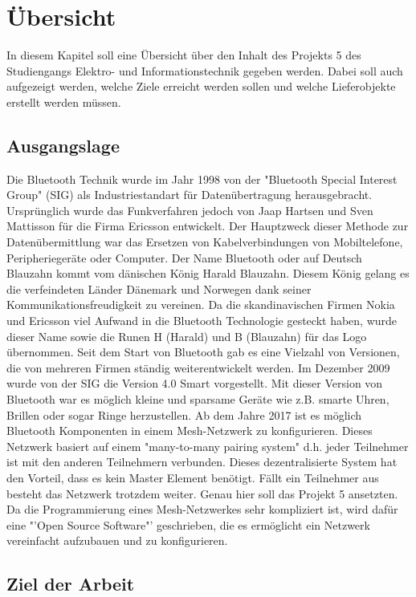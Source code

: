 	\clearpage
\section{Übersicht}\label{sec:Uebersicht}

In diesem Kapitel soll eine Übersicht über den Inhalt des Projekts 5 des Studiengangs Elektro- und Informationstechnik gegeben werden. Dabei soll auch aufgezeigt werden, welche Ziele erreicht werden sollen und welche Lieferobjekte erstellt werden müssen.

\subsection{Ausgangslage}\label{subsec:Ausgangslage}

Die Bluetooth Technik wurde im Jahr 1998 von der "Bluetooth Special Interest Group" (SIG) als Industriestandart für Datenübertragung herausgebracht. Ursprünglich wurde das Funkverfahren jedoch von Jaap Hartsen und Sven Mattisson für die Firma Ericsson entwickelt. Der Hauptzweck dieser Methode zur Datenübermittlung war das Ersetzen von Kabelverbindungen von Mobiltelefone, Peripheriegeräte oder Computer. Der Name Bluetooth oder auf Deutsch Blauzahn kommt vom dänischen König Harald Blauzahn. Diesem König gelang es die verfeindeten Länder Dänemark und Norwegen dank seiner Kommunikationsfreudigkeit zu vereinen. Da die skandinavischen Firmen Nokia und Ericsson viel Aufwand in die Bluetooth Technologie gesteckt haben, wurde dieser Name sowie die Runen H (Harald) und B (Blauzahn) für das Logo übernommen.\cite{michna_entwicklungsgeschichte_2019} Seit dem Start von Bluetooth gab es eine Vielzahl von Versionen, die von mehreren Firmen ständig weiterentwickelt werden. Im Dezember 2009 wurde von der SIG die Version 4.0 Smart vorgestellt. Mit dieser Version von Bluetooth war es möglich kleine und sparsame Geräte wie z.B. smarte Uhren, Brillen oder sogar Ringe herzustellen.\cite{bluetooth_sig_our_2019} Ab dem Jahre 2017 ist es möglich Bluetooth Komponenten in einem Mesh-Netzwerk zu konfigurieren.\cite{eckstein_neue_2019} Dieses Netzwerk basiert auf einem "many-to-many pairing system" d.h. jeder Teilnehmer ist mit den anderen Teilnehmern verbunden. Dieses dezentralisierte System hat den Vorteil, dass es kein Master Element benötigt. Fällt ein Teilnehmer aus besteht das Netzwerk trotzdem weiter.\cite{woolley_intro_2017} Genau hier soll das Projekt 5 ansetzten. Da die Programmierung eines Mesh-Netzwerkes sehr kompliziert ist, wird dafür eine "'Open Source Software"' geschrieben, die es ermöglicht ein Netzwerk vereinfacht aufzubauen und zu konfigurieren.


\subsection{Ziel der Arbeit}\label{subsec:ZielderArbeit}









